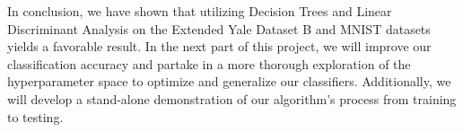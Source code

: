 In conclusion, we have shown that utilizing Decision Trees and Linear Discriminant Analysis on the Extended Yale Dataset B and MNIST datasets yields a favorable result. In the next part of this project, we will improve our classification accuracy and partake in a more thorough exploration of the hyperparameter space to optimize and generalize our classifiers. Additionally, we will develop a stand-alone demonstration of our algorithm's process from training to testing. 